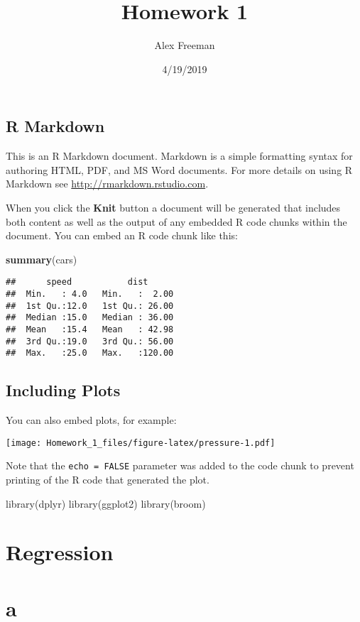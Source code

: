 \documentclass[]{article}
\title{Homework 1}
\author{Alex Freeman}
\date{4/19/2019}
\newenvironment{Shaded}{\begin{snugshade}}{\end{snugshade}}
\newcommand{\KeywordTok}[1]{\textcolor[rgb]{0.13,0.29,0.53}{\textbf{#1}}}
\newcommand{\NormalTok}[1]{#1}
\begin{document}
\maketitle

\subsection{R Markdown}\label{r-markdown}

This is an R Markdown document. Markdown is a simple formatting syntax
for authoring HTML, PDF, and MS Word documents. For more details on
using R Markdown see \url{http://rmarkdown.rstudio.com}.

When you click the \textbf{Knit} button a document will be generated
that includes both content as well as the output of any embedded R code
chunks within the document. You can embed an R code chunk like this:

\begin{Shaded}
\begin{Highlighting}[]
\KeywordTok{summary}\NormalTok{(cars)}
\end{Highlighting}
\end{Shaded}

\begin{verbatim}
##      speed           dist       
##  Min.   : 4.0   Min.   :  2.00  
##  1st Qu.:12.0   1st Qu.: 26.00  
##  Median :15.0   Median : 36.00  
##  Mean   :15.4   Mean   : 42.98  
##  3rd Qu.:19.0   3rd Qu.: 56.00  
##  Max.   :25.0   Max.   :120.00
\end{verbatim}

\subsection{Including Plots}\label{including-plots}

You can also embed plots, for example:

\texttt{[image: Homework\_1\_files/figure-latex/pressure-1.pdf]}

Note that the \texttt{echo\ =\ FALSE} parameter was added to the code
chunk to prevent printing of the R code that generated the plot.

library(dplyr) library(ggplot2) library(broom)

\section{Regression}\label{regression}

\section{a}\label{a}
\end{document}

